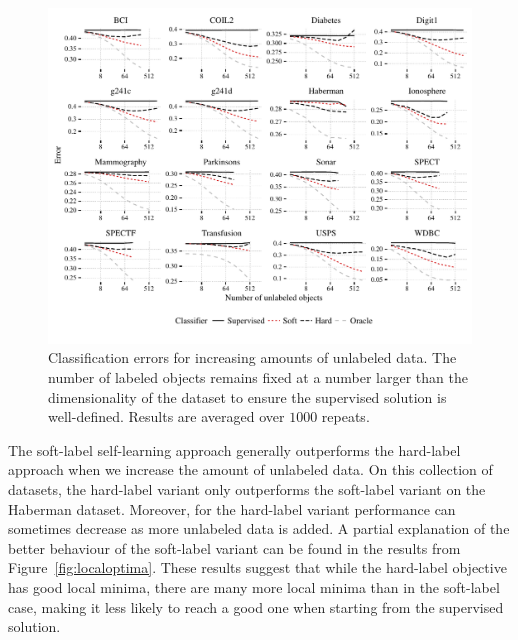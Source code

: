 \documentclass[conference,a4paper,10pt]{IEEEtran}\usepackage[]{graphicx}\usepackage[]{color}
\makeatletter
\def\maxwidth{ %
  \ifdim\Gin@nat@width>\linewidth
    \linewidth
  \else
    \Gin@nat@width
  \fi
}
\newenvironment{knitrout}{}{} %
\makeatother
\begin{document}
\begin{knitrout}
\color{fgcolor}\begin{figure}
\includegraphics[width=\maxwidth]{figure/learningcurves-1} \caption[Classification errors for increasing amounts of unlabeled data]{Classification errors for increasing amounts of unlabeled data. The number of labeled objects remains fixed at a number larger than the dimensionality of the dataset to ensure the supervised solution is well-defined. Results are averaged over $1000$ repeats.}\label{fig:learningcurves}
\end{figure}


\end{knitrout}
The soft-label self-learning approach generally outperforms the hard-label approach when we increase the amount of unlabeled data. On this collection of datasets, the hard-label variant only outperforms the soft-label variant on the Haberman dataset. Moreover, for the hard-label variant performance can sometimes decrease as more unlabeled data is added. A partial explanation of the better behaviour of the soft-label variant can be found in the results from Figure~\ref{fig:localoptima}. These results suggest that while the hard-label objective has good local minima, there are many more local minima than in the soft-label case, making it less likely to reach a good one when starting from the supervised solution.
\end{document}
